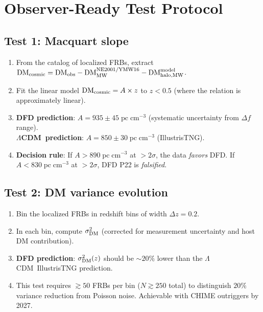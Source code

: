 \documentclass[11pt]{article}
\newcommand{\LCDM}{$\Lambda$CDM}
\newcommand{\pc}{\;\mathrm{pc\;cm}^{-3}}
\begin{document}
\section{Observer-Ready Test Protocol}
\label{sec:protocol}

\subsection{Test 1: Macquart slope}

\begin{enumerate}
\item From the catalog of localized FRBs, extract $\mathrm{DM}_{\rm cosmic}
  = \mathrm{DM}_{\rm obs} - \mathrm{DM}_{\rm MW}^{\rm NE2001/YMW16}
  - \mathrm{DM}_{\rm halo,MW}^{\rm model}$.

\item Fit the linear model $\mathrm{DM}_{\rm cosmic} = A \times z$
  to $z < 0.5$ (where the relation is approximately linear).

\item \textbf{DFD prediction}: $A = 935 \pm 45\pc$ (systematic
  uncertainty from $\Delta f$ range).\\
  \textbf{\LCDM\ prediction}: $A = 850 \pm 30\pc$ (IllustrisTNG).

\item \textbf{Decision rule}: If $A > 890\pc$ at $> 2\sigma$, the
  data \emph{favors} DFD.  If $A < 830\pc$ at $> 2\sigma$, DFD P22
  is \emph{falsified}.
\end{enumerate}

\subsection{Test 2: DM variance evolution}

\begin{enumerate}
\item Bin the localized FRBs in redshift bins of width $\Delta z = 0.2$.
\item In each bin, compute $\sigma_{\rm DM}^2$ (corrected for
  measurement uncertainty and host DM contribution).
\item \textbf{DFD prediction}: $\sigma_{\rm DM}^2(z)$ should be
  $\sim 20\%$ lower than the \LCDM\ IllustrisTNG prediction.
\item This test requires $\gtrsim 50$ FRBs per bin ($N \gtrsim 250$
  total) to distinguish $20\%$ variance reduction from Poisson noise.
  Achievable with CHIME outriggers by 2027.
\end{enumerate}
\end{document}
